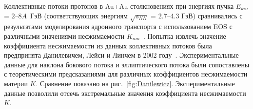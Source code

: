 Коллективные потоки  протонов в Au+Au столкновениях при энергиях пучка
$E_{kin}$ = 2--8$A$~ГэВ (соответствующих энергиям  $\sqrt{s_{NN}}$ = 2.7--4.3 ГэВ) сравнивались с результатами моделирования адронного транспорта с использованием EOS с различными значениями несжимаемости $K_{nm}$~\cite{E895:1999ldn,E895:2000maf,E895:2001axb}. 
Попытка извлечь значение коэффициента несжимаемости из данных коллективных потоков была предпринята Данилевичем, Лейси и Линчем в 2002 году~\cite{Danielewicz:2002pu}.
Экспериментальные данные для наклона бокового потока и эллиптического потока были сопоставлены с теоретическими предсказаниями для различных коэффициентов несжимаемости материи $K$.
Сравнение показано на рис.~\ref{fig:Danilewicz}. 
Экспериментальные данные позволили отсечь экстремальные значения коэффициента несжимаемости $K$.

